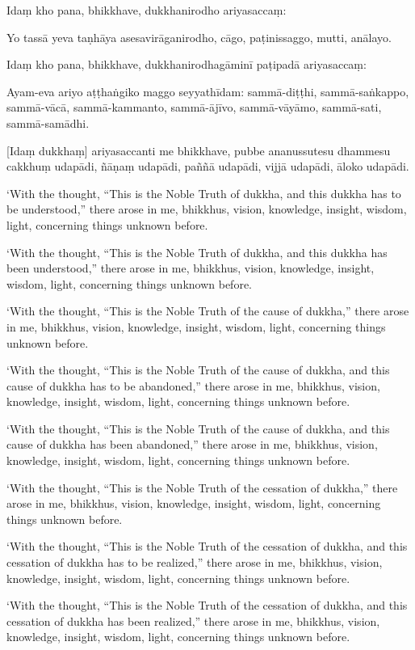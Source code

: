 Idaṃ kho pana, bhikkhave, dukkhanirodho ariyasaccaṃ:

Yo tassā yeva taṇhāya asesavirāganirodho, cāgo, paṭinissaggo, mutti,
anālayo.

Idaṃ kho pana, bhikkhave, dukkhanirodhagāminī paṭipadā ariyasaccaṃ:

Ayam-eva ariyo aṭṭhaṅgiko maggo seyyathīdam: sammā-diṭṭhi,
sammā-saṅkappo, sammā-vācā, sammā-kammanto, sammā-ājīvo, sammā-vāyāmo,
sammā-sati, sammā-samādhi.

[Idaṃ dukkhaṃ] ariyasaccanti me bhikkhave, pubbe ananussutesu dhammesu
cakkhuṃ udapādi, ñāṇaṃ udapādi, paññā udapādi, vijjā udapādi, āloko
udapādi.

\clearpage

\englishText
\markboth{\englishTitle}{\rightmark}

‘With the thought, “This is the Noble Truth of dukkha, and this dukkha
has to be understood,” there arose in me, bhikkhus, vision, knowledge,
insight, wisdom, light, concerning things unknown before.

‘With the thought, “This is the Noble Truth of dukkha, and this dukkha
has been understood,” there arose in me, bhikkhus, vision, knowledge,
insight, wisdom, light, concerning things unknown before.

‘With the thought, “This is the Noble Truth of the cause of dukkha,”
there arose in me, bhikkhus, vision, knowledge, insight, wisdom, light,
concerning things unknown before.

‘With the thought, “This is the Noble Truth of the cause of dukkha, and
this cause of dukkha has to be abandoned,” there arose in me, bhikkhus,
vision, knowledge, insight, wisdom, light, concerning things unknown
before.

‘With the thought, “This is the Noble Truth of the cause of dukkha, and
this cause of dukkha has been abandoned,” there arose in me, bhikkhus,
vision, knowledge, insight, wisdom, light, concerning things unknown
before.

‘With the thought, “This is the Noble Truth of the cessation of dukkha,”
there arose in me, bhikkhus, vision, knowledge, insight, wisdom, light,
concerning things unknown before.

‘With the thought, “This is the Noble Truth of the cessation of dukkha,
and this cessation of dukkha has to be realized,” there arose in me,
bhikkhus, vision, knowledge, insight, wisdom, light, concerning things
unknown before.

‘With the thought, “This is the Noble Truth of the cessation of dukkha,
and this cessation of dukkha has been realized,” there arose in me,
bhikkhus, vision, knowledge, insight, wisdom, light, concerning things
unknown before.

